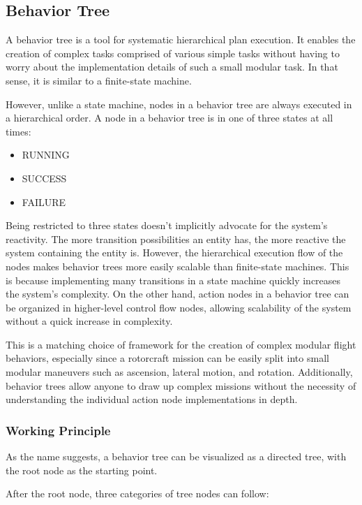 \documentclass{article}
\begin{document}
\subsection{Behavior Tree}\label{subsec:setup:behavior_tree}

A behavior tree is a tool for systematic hierarchical plan execution. It enables the creation of complex tasks comprised of various simple tasks without having to worry about the implementation details of such a small modular task. In that sense, it is similar to a finite-state machine.

However, unlike a state machine, nodes in a behavior tree are always executed in a hierarchical order. A node in a behavior tree is in one of three states at all times: 

\begin{itemize}
    \item RUNNING
    \item SUCCESS
    \item FAILURE
\end{itemize}

Being restricted to three states doesn't implicitly advocate for the system's reactivity. The more transition possibilities an entity has, the more reactive the system containing the entity is. However, the hierarchical execution flow of the nodes makes behavior trees more easily scalable than finite-state machines. This is because implementing many transitions in a state machine quickly increases the system's complexity. On the other hand, action nodes in a behavior tree can be organized in higher-level control flow nodes, allowing scalability of the system without a quick increase in complexity.

This is a matching choice of framework for the creation of complex modular flight behaviors, especially since a rotorcraft mission can be easily split into small modular maneuvers such as ascension, lateral motion, and rotation. Additionally, behavior trees allow anyone to draw up complex missions without the necessity of understanding the individual action node implementations in depth.

\subsubsection{Working Principle}
As the name suggests, a behavior tree can be visualized as a directed tree, with the root node as the starting point. 

After the root node, three categories of tree nodes can follow:
\end{document}

